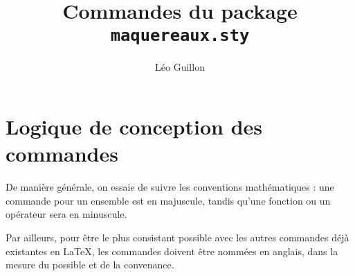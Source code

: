 \documentclass{atomathematyk}
\title{Commandes du package \texttt{maquereaux.sty}}
\author{Léo Guillon}
\date{}
\begin{document}
\maketitle

\section{Logique de conception des commandes}

De manière générale, on essaie de suivre les conventions mathématiques : une commande pour un ensemble est en majuscule, tandis qu’une fonction ou un opérateur sera en minuscule.

Par ailleurs, pour être le plus consistant possible avec les autres commandes déjà existantes en \LaTeX, les commandes doivent être nommées en anglais, dans la mesure du possible et de la convenance.
\end{document}
